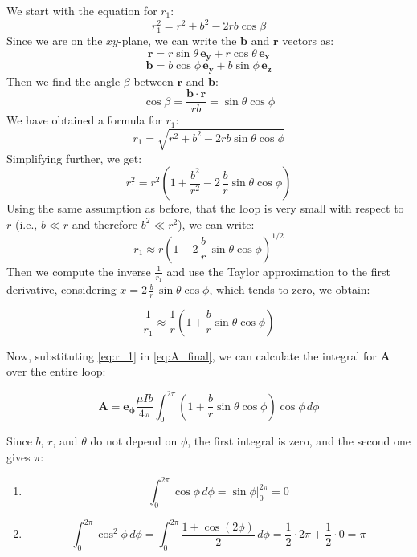 We start with the equation for \( r_1 \):
$$
    r_1^2 = r^2 + b^2 - 2 r b \cos\beta
$$
Since we are on the \( xy \)-plane, we can write the 
\( \mathbf{b} \) and \( \mathbf{r} \) vectors as:
$$
    \mathbf{r} = r \sin \theta \, \mathbf{e_y} 
    + r \cos \theta \, \mathbf{e_x}
$$
$$
    \mathbf{b} = b \cos \phi \, \mathbf{e_y} 
    + b \sin \phi \, \mathbf{e_z}
$$
Then we find the angle \(\beta\) between 
\( \mathbf{r} \) and \( \mathbf{b} \):
$$
    \cos \beta = \frac{\mathbf{b} \cdot \mathbf{r}}{r b} 
    = \sin \theta \cos \phi
$$
We have obtained a formula for \( r_1 \):
$$
    r_1 = \sqrt{r^2 + b^2 - 2 r b \sin \theta \cos \phi}
$$
Simplifying further, we get:
$$
    r_1^2 = r^2 \left( 1 + \frac{b^2}{r^2} - 2\, 
    \frac{b}{r} \sin \theta \cos \phi \right)
$$
Using the same assumption as before, that the loop is 
very small with respect to \( r \) (i.e., \( b \ll r \) 
and therefore \( b^2 \ll r^2 \)), we can write:
$$
    r_1 \approx r \left( 1 - 2 \, \frac{b}{r} \, 
    \sin \theta \cos \phi \right)^{1/2}
$$
Then we compute the inverse \( \frac{1}{r_1} \) and 
use the Taylor approximation to the first derivative, 
considering \( x = 2 \, \frac{b }{r} \, \sin \theta 
\cos \phi \), which tends to zero, we obtain:

\begin{equation}
    \frac{1}{r_1} \approx \frac{1}{r} 
    \left( 1 + \frac{b}{r} \sin \theta \cos \phi \right)
    \label{eq:r_1}
\end{equation}

Now, substituting \ref{eq:r_1} in \ref{eq:A_final}, we 
can calculate the integral for \( \mathbf{A} \) over 
the entire loop:

$$
    \mathbf{A} = \mathbf{e_\phi} \frac{\mu I b}{4 \pi} 
    \int_{0}^{2\pi} \left( 1 + \frac{b}{r} \sin \theta 
    \cos \phi \right) \cos \phi \, d\phi
$$

Since \( b \), \( r \), and $\theta$ do not depend on 
$\phi$, the first integral is zero, and the second one 
gives $\pi$:

\begin{enumerate}[label=(\arabic*)]
    \item 
    \parbox{\textwidth}{
    \[
        \int_0^{2\pi} \cos \phi \, d\phi = \sin \phi \Big|_0^{2\pi} = 0
    \]
    }

    \item 
    \parbox{\textwidth}{
    \[
        \int_{0}^{2\pi} \cos^2 \phi \, d\phi = \int_{0}^{2\pi} 
        \frac{1 + \cos(2\phi)}{2} \, d\phi = \frac{1}{2} \cdot 2\pi 
        + \frac{1}{2} \cdot 0 = \pi
    \]
    }
\end{enumerate}

